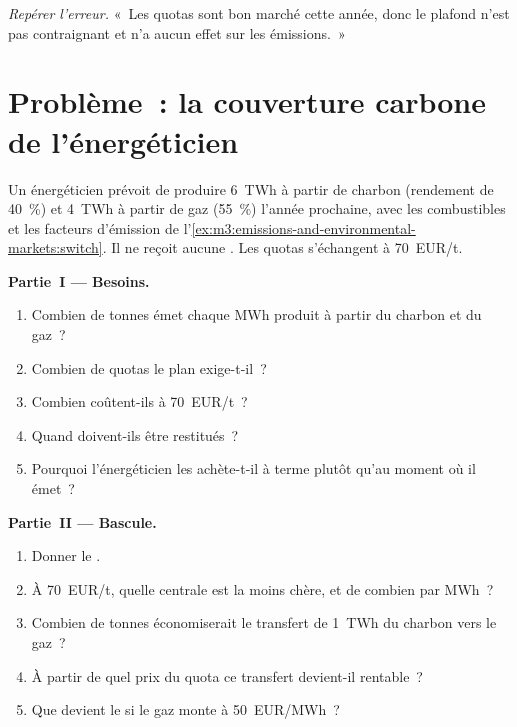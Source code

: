 \begin{exercise}[$\star\star\star$]\label{exo:m3:emissions-and-environmental-markets:8}
\emph{Repérer l'erreur.} «~Les quotas sont bon marché cette année, donc le plafond n'est pas contraignant et n'a aucun effet
sur les émissions.~»
\end{exercise}

\section{Problème~: la couverture carbone de l'énergéticien}

\begin{problem}\label{pb:m3:emissions-and-environmental-markets:1}
Un énergéticien prévoit de produire 6~TWh à partir de charbon (rendement de 40~\%) et 4~TWh à partir de gaz (55~\%) l'année prochaine,
avec les combustibles et les facteurs d'émission de l'\cref{ex:m3:emissions-and-environmental-markets:switch}. Il
ne reçoit aucune . Les quotas s'échangent à \qty{70}{EUR/t}.

\medskip\noindent\textbf{Partie~I --- Besoins.}
\begin{enumerate}
\item Combien de tonnes émet chaque MWh produit à partir du charbon et du gaz~?
\item Combien de quotas le plan exige-t-il~?
\item Combien coûtent-ils à \qty{70}{EUR/t}~?
\item Quand doivent-ils être restitués~?
\item Pourquoi l'énergéticien les achète-t-il à terme plutôt qu'au moment où il émet~?
\end{enumerate}

\medskip\noindent\textbf{Partie~II --- Bascule.}
\begin{enumerate}[resume]
\item Donner le .
\item À \qty{70}{EUR/t}, quelle centrale est la moins chère, et de combien par MWh~?
\item Combien de tonnes économiserait le transfert de 1~TWh du charbon vers le gaz~?
\item À partir de quel prix du quota ce transfert devient-il rentable~?
\item Que devient le  si le gaz monte à \qty{50}{EUR/MWh}~?
\end{enumerate}


\end{problem}
